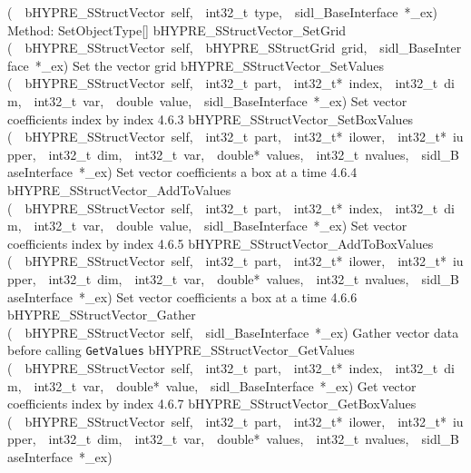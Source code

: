 \documentclass{article}
\begin{document}
\begin{cxxentry}
\begin{cxxentry}
\begin{cxxnames}
        {(\ \ bHYPRE\_SStructVector\ self,\ \ int32\_t\ type,\ \ sidl\_BaseInterface\ *\_ex)}
        {
Method:  SetObjectType[]}
        {}
\label{cxx.4.6.20}
        {bHYPRE\_SStructVector\_SetGrid}
        {(\ \ bHYPRE\_SStructVector\ self,\ \ bHYPRE\_SStructGrid\ grid,\ \ sidl\_BaseInterface\ *\_ex)}
        {
Set the vector grid}
        {}
\label{cxx.4.6.21}
        {bHYPRE\_SStructVector\_SetValues}
        {(\ \ bHYPRE\_SStructVector\ self,\ \ int32\_t\ part,\ \ int32\_t*\ index,\ \ int32\_t\ dim,\ \ int32\_t\ var,\ \ double\ value,\ \ sidl\_BaseInterface\ *\_ex)}
        {
Set vector coefficients index by index}
        {4.6.3}
        {bHYPRE\_SStructVector\_SetBoxValues}
        {(\ \ bHYPRE\_SStructVector\ self,\ \ int32\_t\ part,\ \ int32\_t*\ ilower,\ \ int32\_t*\ iupper,\ \ int32\_t\ dim,\ \ int32\_t\ var,\ \ double*\ values,\ \ int32\_t\ nvalues,\ \ sidl\_BaseInterface\ *\_ex)}
        {
Set vector coefficients a box at a time}
        {4.6.4}
        {bHYPRE\_SStructVector\_AddToValues}
        {(\ \ bHYPRE\_SStructVector\ self,\ \ int32\_t\ part,\ \ int32\_t*\ index,\ \ int32\_t\ dim,\ \ int32\_t\ var,\ \ double\ value,\ \ sidl\_BaseInterface\ *\_ex)}
        {
Set vector coefficients index by index}
        {4.6.5}
        {bHYPRE\_SStructVector\_AddToBoxValues}
        {(\ \ bHYPRE\_SStructVector\ self,\ \ int32\_t\ part,\ \ int32\_t*\ ilower,\ \ int32\_t*\ iupper,\ \ int32\_t\ dim,\ \ int32\_t\ var,\ \ double*\ values,\ \ int32\_t\ nvalues,\ \ sidl\_BaseInterface\ *\_ex)}
        {
Set vector coefficients a box at a time}
        {4.6.6}
        {bHYPRE\_SStructVector\_Gather}
        {(\ \ bHYPRE\_SStructVector\ self,\ \ sidl\_BaseInterface\ *\_ex)}
        {
Gather vector data before calling {\tt GetValues}}
        {}
\label{cxx.4.6.22}
        {bHYPRE\_SStructVector\_GetValues}
        {(\ \ bHYPRE\_SStructVector\ self,\ \ int32\_t\ part,\ \ int32\_t*\ index,\ \ int32\_t\ dim,\ \ int32\_t\ var,\ \ double*\ value,\ \ sidl\_BaseInterface\ *\_ex)}
        {
Get vector coefficients index by index}
        {4.6.7}
        {bHYPRE\_SStructVector\_GetBoxValues}
        {(\ \ bHYPRE\_SStructVector\ self,\ \ int32\_t\ part,\ \ int32\_t*\ ilower,\ \ int32\_t*\ iupper,\ \ int32\_t\ dim,\ \ int32\_t\ var,\ \ double*\ values,\ \ int32\_t\ nvalues,\ \ sidl\_BaseInterface\ *\_ex)}

\end{cxxnames}
\end{cxxentry}
\end{cxxentry}
\end{document}
